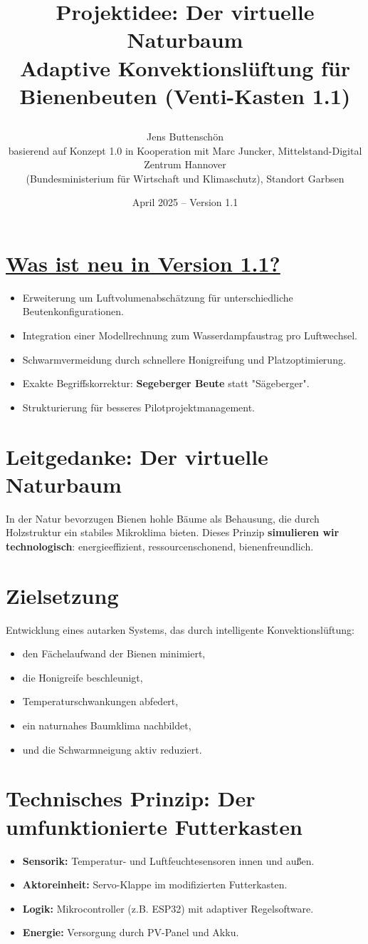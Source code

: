 \documentclass[11pt,a4paper]{article}
\title{\parbox{\linewidth}{\centering\textbf{
Projektidee: Der virtuelle Naturbaum\\
Adaptive Konvektionsl\"uftung f\"ur Bienenbeuten (Venti-Kasten 1.1)}}}
\author{\parbox{\linewidth}{\centering
Jens Buttensch\"on\\
\small basierend auf Konzept 1.0 in Kooperation mit Marc Juncker, Mittelstand-Digital Zentrum Hannover\\
(Bundesministerium f\"ur Wirtschaft und Klimaschutz), Standort Garbsen}}
\date{April 2025 -- Version 1.1}
\begin{document}
\maketitle

\section*{\normalsize \underline{Was ist neu in Version 1.1?}}
\begin{itemize}[topsep=2pt]
  \item Erweiterung um Luftvolumenabsch\"atzung f\"ur unterschiedliche Beutenkonfigurationen.
  \item Integration einer Modellrechnung zum Wasserdampfaustrag pro Luftwechsel.
  \item Schwarmvermeidung durch schnellere Honigreifung und Platzoptimierung.
  \item Exakte Begriffskorrektur: \textbf{Segeberger Beute} statt "S\"ageberger".
  \item Strukturierung f\"ur besseres Pilotprojektmanagement.
\end{itemize}

\section*{Leitgedanke: Der virtuelle Naturbaum}
In der Natur bevorzugen Bienen hohle B\"aume als Behausung, die durch Holzstruktur ein stabiles Mikroklima bieten. Dieses Prinzip \textbf{simulieren wir technologisch}: energieeffizient, ressourcenschonend, bienenfreundlich.

\section{Zielsetzung}
Entwicklung eines autarken Systems, das durch intelligente Konvektionsl\"uftung:
\begin{itemize}[topsep=2pt]
  \item den F\"achelaufwand der Bienen minimiert,
  \item die Honigreife beschleunigt,
  \item Temperaturschwankungen abfedert,
  \item ein naturnahes Baumklima nachbildet,
  \item und die Schwarmneigung aktiv reduziert.
\end{itemize}

\section{Technisches Prinzip: Der umfunktionierte Futterkasten}
\begin{itemize}[topsep=2pt]
  \item \textbf{Sensorik:} Temperatur- und Luftfeuchtesensoren innen und au\u{\ss}en.
  \item \textbf{Aktoreinheit:} Servo-Klappe im modifizierten Futterkasten.
  \item \textbf{Logik:} Mikrocontroller (z.B. ESP32) mit adaptiver Regelsoftware.
  \item \textbf{Energie:} Versorgung durch PV-Panel und Akku.
\end{itemize}
\end{document}

